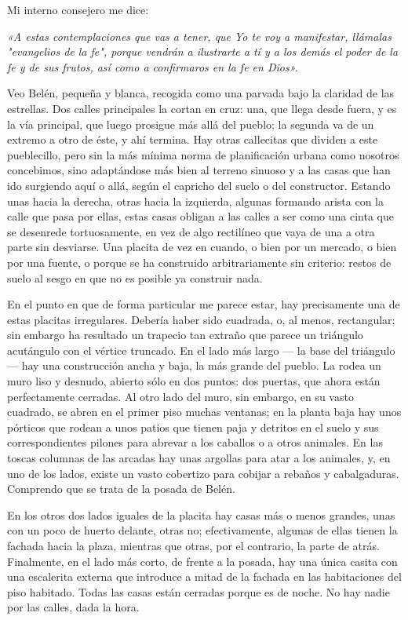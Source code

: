 \documentclass[12pt]{book} %
\begin{document}
Mi interno consejero me dice: 

\emph{«A estas contemplaciones que vas a tener, que Yo te voy a manifestar, llámalas "evangelios de la fe", porque vendrán a ilustrarte a tí y a los demás el poder de la fe y de sus frutos, así como a confirmaros en la fe en Dios».}

Veo Belén, pequeña y blanca, recogida como una parvada bajo la claridad de las estrellas. Dos calles principales la cortan en cruz: una, que llega desde fuera, y es la vía principal, que luego prosigue más allá del pueblo; la segunda va de un extremo a otro de éste, y ahí termina. Hay otras callecitas que dividen a este pueblecillo, pero sin la más mínima norma de planificación urbana como nosotros concebimos, sino adaptándose más bien al terreno sinuoso y a las casas que han ido surgiendo aquí o allá, según el capricho del suelo o del constructor. Estando unas hacia la derecha, otras hacia la izquierda, algunas formando arista con la calle que pasa por ellas, estas casas obligan a las calles a ser como una cinta que se desenrede tortuosamente, en vez de algo rectilíneo que vaya de una a otra parte sin desviarse. Una placita de vez en cuando, o bien por un mercado, o bien por una fuente, o porque se ha construido arbitrariamente sin criterio: restos de suelo al sesgo en que no es posible ya construir nada. 

En el punto en que de forma particular me parece estar, hay precisamente una de estas placitas irregulares. Debería haber sido cuadrada, o, al menos, rectangular; sin embargo ha resultado un trapecio tan extraño que parece un triángulo acutángulo con el vértice truncado. En el lado más largo — la base del triángulo — hay una construcción ancha y baja, la más grande del pueblo. La rodea un muro liso y desnudo, abierto sólo en dos puntos: dos puertas, que ahora están perfectamente cerradas. Al otro lado del muro, sin embargo, en su vasto cuadrado, se abren en el primer piso muchas ventanas; en la planta baja hay unos pórticos que rodean a unos patios que tienen paja y detritos en el suelo y sus correspondientes pilones para abrevar a los caballos o a otros animales. En las toscas columnas de las arcadas hay unas argollas para atar a los animales, y, en uno de los lados, existe un vasto cobertizo para cobijar a rebaños y cabalgaduras. Comprendo que se trata de la posada de Belén. 

En los otros dos lados iguales de la placita hay casas más o menos grandes, unas con un poco de huerto delante, otras no; efectivamente, algunas de ellas tienen la fachada hacia la plaza, mientras que otras, por el contrario, la parte de atrás. Finalmente, en el lado más corto, de frente a la posada, hay una única casita con una escalerita externa que introduce a mitad de la fachada en las habitaciones del piso habitado. Todas las casas están cerradas porque es de noche. No hay nadie por las calles, dada la hora. 
\end{document}
